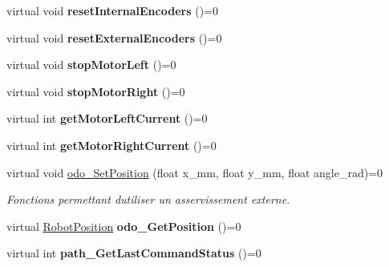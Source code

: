 \begin{DoxyCompactItemize}
\mbox{\label{classAAsservDriver_a40cc13dd2668e52283fa8fdc22ba7805}} 
virtual void {\bfseries reset\+Internal\+Encoders} ()=0
\item 
\mbox{\label{classAAsservDriver_ac1124f108bbdb293cf71ae1ce3d0222c}} 
virtual void {\bfseries reset\+External\+Encoders} ()=0
\item 
\mbox{\label{classAAsservDriver_a7e3415d0b04fb227e468f23f7b7a0ad0}} 
virtual void {\bfseries stop\+Motor\+Left} ()=0
\item 
\mbox{\label{classAAsservDriver_aaa92c72fe63cf97fb219566f912bdbbc}} 
virtual void {\bfseries stop\+Motor\+Right} ()=0
\item 
\mbox{\label{classAAsservDriver_a8b6c4cafec7a55188604ec8af44b11bb}} 
virtual int {\bfseries get\+Motor\+Left\+Current} ()=0
\item 
\mbox{\label{classAAsservDriver_a29ab60a2685bdec463339cca10e6efaf}} 
virtual int {\bfseries get\+Motor\+Right\+Current} ()=0
\item 
\mbox{\label{classAAsservDriver_a1980c0a6071940839bfe9782ab939db0}} 
virtual void \hyperlink{classAAsservDriver_a1980c0a6071940839bfe9782ab939db0}{odo\+\_\+\+Set\+Position} (float x\+\_\+mm, float y\+\_\+mm, float angle\+\_\+rad)=0
\begin{DoxyCompactList}\small\item\em Fonctions permettant d\textquotesingle{}utiliser un asservissement externe. \end{DoxyCompactList}\item 
\mbox{\label{classAAsservDriver_acaea1ffd7a880d7796b1274bea4cff96}} 
virtual \hyperlink{structRobotPosition}{Robot\+Position} {\bfseries odo\+\_\+\+Get\+Position} ()=0
\item 
\mbox{\label{classAAsservDriver_af6cff4776b36ad5f17e3683112eaba86}} 
virtual int {\bfseries path\+\_\+\+Get\+Last\+Command\+Status} ()=0
\item 
\mbox{\label{classAAsservDriver_a3c40ae9ee4591963723aab90e7b1d7a0}} 

\end{DoxyCompactItemize}
